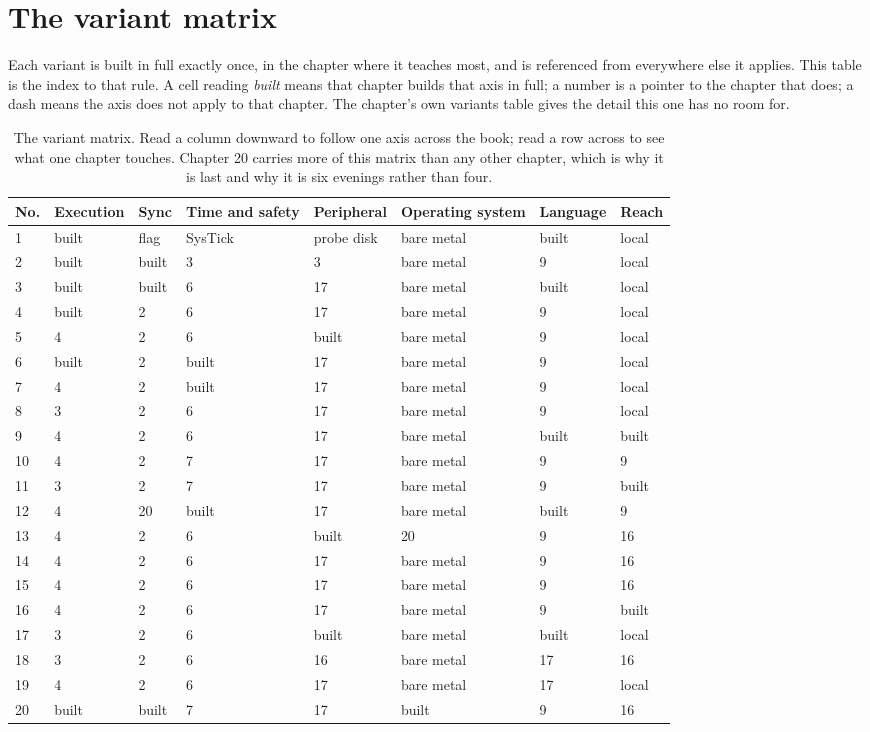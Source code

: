 \section{The variant matrix}

Each variant is built in full exactly once, in the chapter where it teaches
most, and is referenced from everywhere else it applies. This table is the index
to that rule. A cell reading \emph{built} means that chapter builds that axis in
full; a number is a pointer to the chapter that does; a dash means the axis does
not apply to that chapter. The chapter's own variants table gives the detail
this one has no room for.

\begin{table}[H]\centering\small
\begin{tabular}{p{9mm}p{17mm}p{17mm}p{17mm}p{17mm}p{17mm}p{17mm}p{17mm}}
\toprule
No. & Execution & Sync & Time and safety & Peripheral & Operating system & Language & Reach \\
\midrule
1 & built & flag & SysTick & probe disk & bare metal & built & local \\
2 & built & built & 3 & 3 & bare metal & 9 & local \\
3 & built & built & 6 & 17 & bare metal & built & local \\
4 & built & 2 & 6 & 17 & bare metal & 9 & local \\
5 & 4 & 2 & 6 & built & bare metal & 9 & local \\
6 & built & 2 & built & 17 & bare metal & 9 & local \\
7 & 4 & 2 & built & 17 & bare metal & 9 & local \\
8 & 3 & 2 & 6 & 17 & bare metal & 9 & local \\
9 & 4 & 2 & 6 & 17 & bare metal & built & built \\
10 & 4 & 2 & 7 & 17 & bare metal & 9 & 9 \\
11 & 3 & 2 & 7 & 17 & bare metal & 9 & built \\
12 & 4 & 20 & built & 17 & bare metal & built & 9 \\
13 & 4 & 2 & 6 & built & 20 & 9 & 16 \\
14 & 4 & 2 & 6 & 17 & bare metal & 9 & 16 \\
15 & 4 & 2 & 6 & 17 & bare metal & 9 & 16 \\
16 & 4 & 2 & 6 & 17 & bare metal & 9 & built \\
17 & 3 & 2 & 6 & built & bare metal & built & local \\
18 & 3 & 2 & 6 & 16 & bare metal & 17 & 16 \\
19 & 4 & 2 & 6 & 17 & bare metal & 17 & local \\
20 & built & built & 7 & 17 & built & 9 & 16 \\
\bottomrule
\end{tabular}
\caption{The variant matrix. Read a column downward to follow one axis across the book; read a row across to see what one chapter touches. Chapter 20 carries more of this matrix than any other chapter, which is why it is last and why it is six evenings rather than four.}
\end{table}

